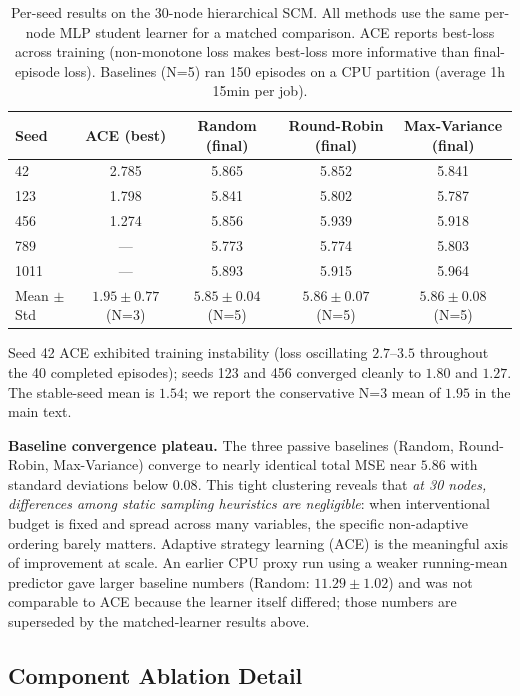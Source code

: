 \begin{table}[h]
\centering
\caption{Per-seed results on the 30-node hierarchical SCM. All methods use the same per-node MLP student learner for a matched comparison. ACE reports best-loss across training (non-monotone loss makes best-loss more informative than final-episode loss). Baselines (N=5) ran 150 episodes on a CPU partition (average 1h 15min per job).}
\label{tab:30node-perseed}
\small
\begin{tabular}{@{}l cccc@{}}
\toprule
Seed & ACE (best) & Random (final) & Round-Robin (final) & Max-Variance (final) \\
\midrule
42   & 2.785 & 5.865 & 5.852 & 5.841 \\
123  & 1.798 & 5.841 & 5.802 & 5.787 \\
456  & 1.274 & 5.856 & 5.939 & 5.918 \\
789  & ---   & 5.773 & 5.774 & 5.803 \\
1011 & ---   & 5.893 & 5.915 & 5.964 \\
\midrule
Mean $\pm$ Std & $1.95\pm0.77$ (N=3) & $5.85\pm0.04$ (N=5) & $5.86\pm0.07$ (N=5) & $5.86\pm0.08$ (N=5) \\
\bottomrule
\end{tabular}
\end{table}

Seed 42 ACE exhibited training instability (loss oscillating $2.7$--$3.5$ throughout the 40 completed episodes); seeds 123 and 456 converged cleanly to $1.80$ and $1.27$. The stable-seed mean is $1.54$; we report the conservative N=3 mean of $1.95$ in the main text.

\textbf{Baseline convergence plateau.} The three passive baselines (Random, Round-Robin, Max-Variance) converge to nearly identical total MSE near $5.86$ with standard deviations below $0.08$. This tight clustering reveals that \emph{at 30 nodes, differences among static sampling heuristics are negligible}: when interventional budget is fixed and spread across many variables, the specific non-adaptive ordering barely matters. Adaptive strategy learning (ACE) is the meaningful axis of improvement at scale. An earlier CPU proxy run using a weaker running-mean predictor gave larger baseline numbers (Random: $11.29\pm1.02$) and was not comparable to ACE because the learner itself differed; those numbers are superseded by the matched-learner results above.

\subsection{Component Ablation Detail}
\label{app:ablation-detail}

